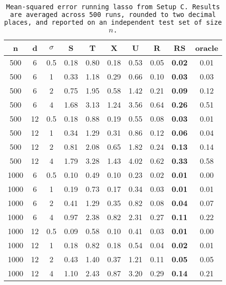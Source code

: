 \begin{table}[ht]
\centering
\begin{tabular}{cccccccccc}
  \hline
n & d & $\sigma$ & S & T & X & U & R & RS & oracle \\ 
  \hline
500 & 6 & 0.5 & 0.18 & 0.80 & 0.18 & 0.53 & 0.05 & \bf 0.02 & 0.01 \\ 
  500 & 6 & 1 & 0.33 & 1.18 & 0.29 & 0.66 & 0.10 & \bf 0.03 & 0.03 \\ 
  500 & 6 & 2 & 0.75 & 1.95 & 0.58 & 1.42 & 0.21 & \bf 0.09 & 0.12 \\ 
  500 & 6 & 4 & 1.68 & 3.13 & 1.24 & 3.56 & 0.64 & \bf 0.26 & 0.51 \\ 
  500 & 12 & 0.5 & 0.18 & 0.88 & 0.19 & 0.55 & 0.08 & \bf 0.03 & 0.01 \\ 
  500 & 12 & 1 & 0.34 & 1.29 & 0.31 & 0.86 & 0.12 & \bf 0.06 & 0.04 \\ 
  500 & 12 & 2 & 0.81 & 2.08 & 0.65 & 1.82 & 0.24 & \bf 0.13 & 0.14 \\ 
  500 & 12 & 4 & 1.79 & 3.28 & 1.43 & 4.02 & 0.62 & \bf 0.33 & 0.58 \\ 
  1000 & 6 & 0.5 & 0.10 & 0.49 & 0.10 & 0.23 & 0.02 & \bf 0.01 & 0.00 \\ 
  1000 & 6 & 1 & 0.19 & 0.73 & 0.17 & 0.34 & 0.03 & \bf 0.01 & 0.01 \\ 
  1000 & 6 & 2 & 0.41 & 1.29 & 0.35 & 0.82 & 0.08 & \bf 0.04 & 0.07 \\ 
  1000 & 6 & 4 & 0.97 & 2.38 & 0.82 & 2.31 & 0.27 & \bf 0.11 & 0.22 \\ 
  1000 & 12 & 0.5 & 0.09 & 0.58 & 0.10 & 0.41 & 0.03 & \bf 0.01 & 0.00 \\ 
  1000 & 12 & 1 & 0.18 & 0.82 & 0.18 & 0.54 & 0.04 & \bf 0.02 & 0.01 \\ 
  1000 & 12 & 2 & 0.43 & 1.40 & 0.37 & 1.21 & 0.11 & \bf 0.05 & 0.05 \\ 
  1000 & 12 & 4 & 1.10 & 2.43 & 0.87 & 3.20 & 0.29 & \bf 0.14 & 0.21 \\ 
   \hline
\end{tabular}
\caption{\tt Mean-squared error running \texttt{lasso} from Setup C. Results are averaged across 500 runs, rounded to two decimal places, and reported on an independent test set of size $n$.} 
\label{table:setup3}
\end{table}
